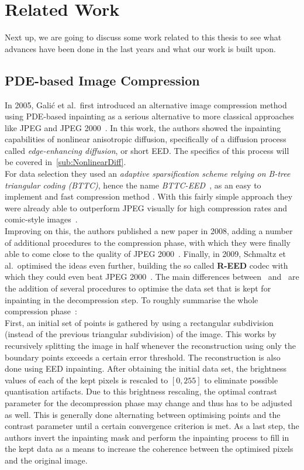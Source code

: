 \section{Related Work}

Next up, we are going to discuss some work related to this thesis to see what advances have been done
in the last years and what our work is built upon.

\subsection{PDE-based Image Compression}
In 2005, Galić et al.\ first introduced an alternative image compression method using PDE-based inpainting as
a serious alternative to more classical approaches like JPEG and JPEG 2000~\cite{galic05}. In this
work, the authors showed the inpainting capabilities of nonlinear anisotropic diffusion, specifically of
a diffusion process called \textit{edge-enhancing diffusion}, or short EED.\@
The specifics of this process will be covered in~\ref{sub:NonlinearDiff}.\\
For data selection they used an
\textit{adaptive sparsification scheme relying on B-tree triangular coding (BTTC)}, hence the name
\textit{BTTC-EED}~\cite{galic05}, as an easy to implement and fast compression method
\cite{distasi97}.
With this fairly simple approach they were already able to outperform JPEG visually for high
compression rates and comic-style images~\cite{galic05}.\\
Improving on this, the authors published a new paper in 2008, adding a number of additional
procedures to the compression phase, with which they were finally able to come close to the quality
of JPEG 2000~\cite{galic08}.
Finally, in 2009, Schmaltz et al.\ optimised the ideas even further, building the
so called \textbf{R-EED} codec with which they could even beat JPEG 2000~\cite{schmaltz09}.
The main differences between~\cite{galic05} and~\cite{schmaltz09} are the addition of several
procedures to optimise the data set that is kept for inpainting in the decompression step.
To roughly summarise the whole compression phase~\cite{schmaltz09}:\\
First, an initial set of points is gathered by using a rectangular subdivision (instead of the
previous triangular subdivision) of the image. This works by recursively splitting the image in
half whenever the reconstruction using only the boundary points exceeds a certain error threshold.
The reconstruction is also done using EED inpainting.
After obtaining the initial data set, the brightness values of each of the kept pixels is rescaled
to $[0, 255]$ to eliminate possible quantisation artifacts. Due to this brightness rescaling, the
optimal contrast parameter for the decompression phase may change and thus has to be adjusted as
well. This is generally done alternating between optimising points and the contrast
parameter until a certain convergence criterion is met.
As a last step, the authors invert the inpainting mask and perform the inpainting process to fill in
    the kept data as a means to increase the coherence between the optimised pixels and the
    original image.

